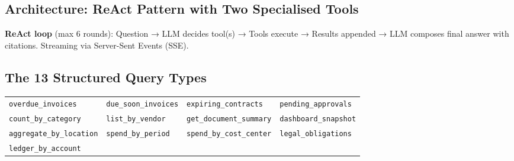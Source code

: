 \documentclass[12pt,a4paper]{article}
\newcommand{\codeinline}[1]{\texttt{\small\color{NordicBlue}#1}}
\begin{document}
\subsection{Architecture: ReAct Pattern with Two Specialised Tools}

\begin{tcolorbox}[colback=LightBg, colframe=NordicBlue, boxrule=1pt, arc=4pt]
\textbf{ReAct loop} (max 6 rounds): Question → LLM decides tool(s) → Tools execute → Results appended → LLM composes final answer with citations. Streaming via Server-Sent Events (SSE).
\end{tcolorbox}

\begin{center}
\end{center}

\subsection{The 13 Structured Query Types}

\begin{tabular}{llll}
\toprule
\codeinline{overdue\_invoices} & \codeinline{due\_soon\_invoices} & \codeinline{expiring\_contracts} & \codeinline{pending\_approvals} \\
\codeinline{count\_by\_category} & \codeinline{list\_by\_vendor} & \codeinline{get\_document\_summary} & \codeinline{dashboard\_snapshot} \\
\codeinline{aggregate\_by\_location} & \codeinline{spend\_by\_period} & \codeinline{spend\_by\_cost\_center} & \codeinline{legal\_obligations} \\
\codeinline{ledger\_by\_account} & & & \\
\bottomrule
\end{tabular}
\end{document}
